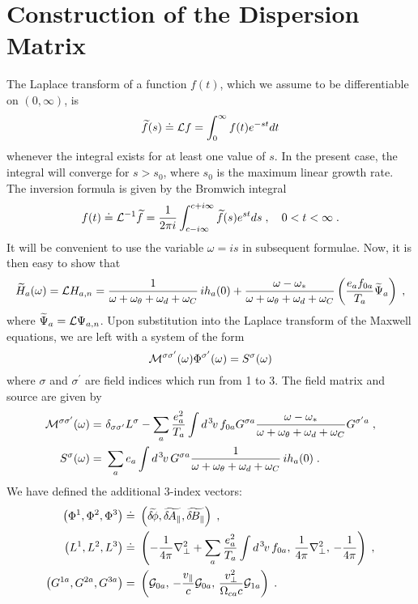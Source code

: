 \section{Construction of the Dispersion Matrix}
The Laplace transform \cite{zayed:1996} of a function $f(t)$, which 
we assume to be differentiable on $(0,\infty)$, is
%
\begin{equation}
\widetilde{f}(s) \doteq {\cal L} f = \int_0^\infty f(t) e^{-st} dt
\end{equation}
%
whenever the integral exists for at least one value of $s$.  In the present 
case, the integral will converge for $s > s_0$, where $s_0$ is the maximum 
linear growth rate. The inversion formula is given by the Bromwich integral
%
\begin{equation}
f(t) \doteq {\cal L}^{-1} \widetilde{f} = \frac{1}{2\pi i} \int_{c-i\infty}^{c+i\infty} 
\widetilde{f}(s) e^{st} ds \; , \quad 0 < t < \infty \; .
\end{equation}
%
It will be convenient to use the variable $\omega=is$ in subsequent formulae.
Now, it is then easy to show that
%
\begin{equation}
\widetilde{H}_a(\omega) = {\cal L} H_{a,n} = 
 \frac{1}{\omega + \omega_\theta + \omega_d +\omega_C} \, ih_a(0) 
+ \frac{\omega-\omega_*}{\omega + \omega_\theta + \omega_d+\omega_C} 
\left( \frac{e_a f_{0a}}{T_a} \widetilde{\Psi}_a \right) \; ,
\end{equation}
%
where $\widetilde{\Psi}_a = {\cal L} \Psi_{a,n}$.
Upon substitution into the Laplace transform of the Maxwell 
equations, we are left with a system of the form
%
\begin{equation}
{\cal M}^{\sigma\sigma^\prime}(\omega) \Phi^{\sigma^\prime}(\omega) = 
 S^\sigma(\omega)
\end{equation}
%
where $\sigma$ and $\sigma^\prime$ are field indices which run from 
1 to 3.  The field matrix and source are given by
%
\begin{align}
{\cal M}^{\sigma\sigma^\prime}(\omega) = &~\delta_{\sigma\sigma^\prime}
L^\sigma - 
 \sum_a \frac{e_a^2}{T_a} \int d^{\hskip 1pt 3} \hskip -1pt v \, f_{0a} G^{\sigma a} 
\frac{\omega-\omega_*}{\omega+\omega_\theta+\omega_d+\omega_C} 
 G^{\sigma^\prime a} \; , \\
S^\sigma(\omega) = &~\sum_a e_a \int d^{\hskip 1pt 3} \hskip -1pt v \, G^{\sigma a} 
\frac{1}{\omega+\omega_\theta+\omega_d+\omega_C} 
\, ih_a(0) \; .
\end{align}
%
We have defined the additional 3-index vectors:
%
\begin{align}
\left(\Phi^1,\Phi^2,\Phi^3\right) \doteq &~\left(
\widetilde{\delta \hskip -1pt \phi},\widetilde{\delta \hskip -1pt A_\parallel},\widetilde{\delta \hskip -1pt B_\parallel} \right) \; , \\
\left(L^1,L^2,L^3\right) \doteq &~\left(
-\frac{1}{4\pi}\nabla_\perp^2+\sum_a \frac{e_a^2}{T_a} \int d^{\hskip 1pt 3} \hskip -1pt v \, f_{0a} , \,
\frac{1}{4\pi}\nabla_\perp^2, \,
-\frac{1}{4\pi} 
\right) \; , \\
\left( G^{1a}, G^{2a}, G^{3a} \right) = &~\left(
{\cal G}_{0a},\, 
-\frac{v_\parallel}{c}{\cal G}_{0a}, \,
\frac{v_\perp^2}{\Omega_{ca}c} {\cal G}_{1a} \right) \; .
\end{align}
